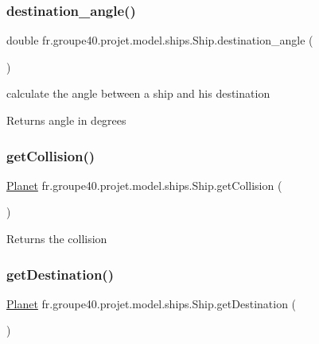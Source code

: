 \subsubsection{\texorpdfstring{destination\+\_\+angle()}{destination\_angle()}}
{\footnotesize\ttfamily double fr.\+groupe40.\+projet.\+model.\+ships.\+Ship.\+destination\+\_\+angle (\begin{DoxyParamCaption}{ }\end{DoxyParamCaption})}



calculate the angle between a ship and his destination 

\begin{DoxyReturn}{Returns}
angle in degrees 
\end{DoxyReturn}
\mbox{\label{classfr_1_1groupe40_1_1projet_1_1model_1_1ships_1_1_ship_a7fb131bafd7937973eecd26870796dd8}} 
\subsubsection{\texorpdfstring{get\+Collision()}{getCollision()}}
{\footnotesize\ttfamily \hyperlink{classfr_1_1groupe40_1_1projet_1_1model_1_1planets_1_1_planet}{Planet} fr.\+groupe40.\+projet.\+model.\+ships.\+Ship.\+get\+Collision (\begin{DoxyParamCaption}{ }\end{DoxyParamCaption})}

\begin{DoxyReturn}{Returns}
the collision 
\end{DoxyReturn}
\mbox{\label{classfr_1_1groupe40_1_1projet_1_1model_1_1ships_1_1_ship_ac4f24f0b83dfec2b15cf455c79b75e24}} 
\subsubsection{\texorpdfstring{get\+Destination()}{getDestination()}}
{\footnotesize\ttfamily \hyperlink{classfr_1_1groupe40_1_1projet_1_1model_1_1planets_1_1_planet}{Planet} fr.\+groupe40.\+projet.\+model.\+ships.\+Ship.\+get\+Destination (\begin{DoxyParamCaption}{ }\end{DoxyParamCaption})}

